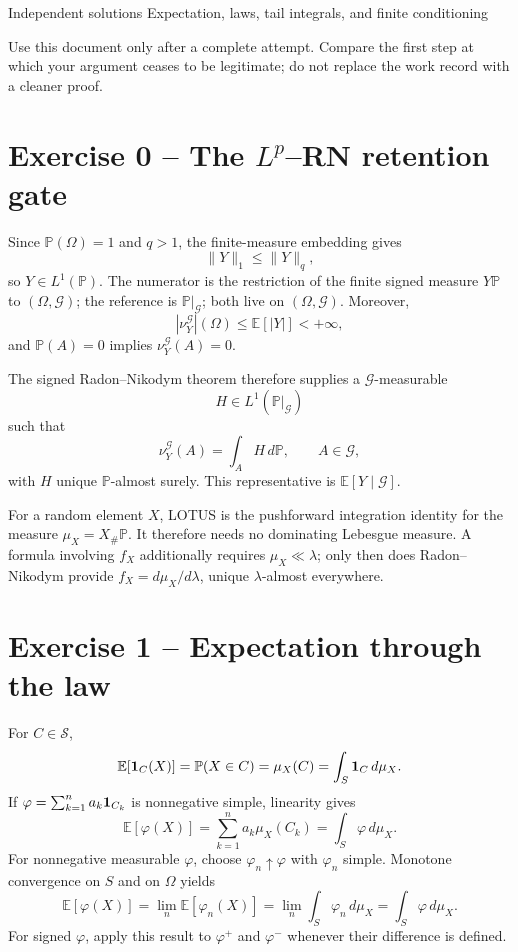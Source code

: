 \sheettitle
  {Independent solutions}
  {Expectation, laws, tail integrals, and finite conditioning}

Use this document only after a complete attempt. Compare the first step at which your argument ceases to be legitimate; do not replace the work record with a cleaner proof.

\section*{Exercise 0 -- The $L^p$--RN retention gate}

Since $\mathbb P(\Omega)=1$ and $q>1$, the finite-measure embedding gives
\[
\|Y\|_1\le\|Y\|_q,
\]
so $Y\in L^1(\mathbb P)$. The numerator is the restriction of the finite signed measure $Y\mathbb P$ to $(\Omega,\mathcal G)$; the reference is $\mathbb P|_{\mathcal G}$; both live on $(\Omega,\mathcal G)$. Moreover,
\[
|\nu_Y^{\mathcal G}|(\Omega)
\le
\mathbb E[|Y|]
<+\infty,
\]
and $\mathbb P(A)=0$ implies $\nu_Y^{\mathcal G}(A)=0$.

The signed Radon--Nikodym theorem therefore supplies a $\mathcal G$-measurable
\[
H\in L^1(\mathbb P|_{\mathcal G})
\]
such that
\[
\nu_Y^{\mathcal G}(A)
=
\int_AH\,d\mathbb P,
\qquad A\in\mathcal G,
\]
with $H$ unique $\mathbb P$-almost surely. This representative is $\mathbb E[Y\mid\mathcal G]$.

For a random element $X$, LOTUS is the pushforward integration identity for the measure $\mu_X=X_\#\mathbb P$. It therefore needs no dominating Lebesgue measure. A formula involving $f_X$ additionally requires $\mu_X\ll\lambda$; only then does Radon--Nikodym provide $f_X=d\mu_X/d\lambda$, unique $\lambda$-almost everywhere.

\section*{Exercise 1 -- Expectation through the law}

For $C\in\mathcal S$,
\[
\mathbb E[\mathbf 1_C(X)]
=
\mathbb P(X\in C)
=
\mu_X(C)
=
\int_S\mathbf 1_C\,d\mu_X.
\]
If $\varphi=\sum_{k=1}^na_k\mathbf 1_{C_k}$ is nonnegative simple, linearity gives
\[
\mathbb E[\varphi(X)]
=
\sum_{k=1}^na_k\mu_X(C_k)
=
\int_S\varphi\,d\mu_X.
\]
For nonnegative measurable $\varphi$, choose $\varphi_n\uparrow\varphi$ with $\varphi_n$ simple. Monotone convergence on $S$ and on $\Omega$ yields
\[
\mathbb E[\varphi(X)]
=
\lim_n\mathbb E[\varphi_n(X)]
=
\lim_n\int_S\varphi_n\,d\mu_X
=
\int_S\varphi\,d\mu_X.
\]
For signed $\varphi$, apply this result to $\varphi^+$ and $\varphi^-$ whenever their difference is defined.

